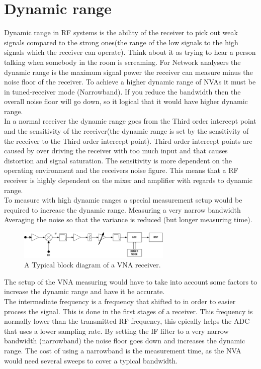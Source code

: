 \section{Dynamic range}
Dynamic range in RF systems is the ability of the receiver to pick out weak signals compared to the strong ones(the range of the low signals to the high signals which the receiver can operate). Think about it as trying to hear a person talking when somebody in the room is screaming. For Network analysers the dynamic range is the maximum signal power the receiver can measure minus the noise floor of the receiver. To achieve a higher dynamic range of NVAs it must be  in tuned-receiver mode (Narrowband). If you reduce the bandwidth then the overall noise floor will go down, so it logical that it would have higher dynamic range. \citep{AgilentNVA} \\
In a normal receiver the dynamic range goes from the Third order intercept point and the sensitivity of the receiver(the dynamic range is set by the sensitivity of the receiver to the Third order intercept point). Third order intercept points are caused by over driving the receiver with too much input and that causes distortion and signal saturation. The sensitivity is more dependent on the operating environment and the receivers noise figure. \citep{understandDynamic} This means that a RF receiver is highly dependent on the mixer and amplifier with regards to dynamic range.\\
To measure with high dynamic ranges a special measurement setup would be required to increase the dynamic range.
Measuring a very narrow bandwidth
Averaging the noise so that the variance is reduced (but longer measuring time).

\begin{figure}[H]
\centering
\includegraphics[width=0.65\textwidth]{figures/Block_VNA.png}
\caption{A Typical block diagram of a VNA receiver.}
\label{fading_gain}
\end{figure}

The setup of the VNA measuring would have to take into account some factors to increase the dynamic range and have it be accurate. \\
The intermediate frequency is a frequency that shifted to in order to easier process the signal. This is done in the first stages of a receiver. This frequency is normally lower than the transmitted RF frequency, this epically helps the ADC that uses a lower sampling rate. 
By setting the IF filter to a very narrow bandwidth (narrowband) the noise floor goes down and increases the dynamic range. The cost of using a narrowband is the measurement time, as the NVA would need several sweeps to cover a typical bandwidth.

